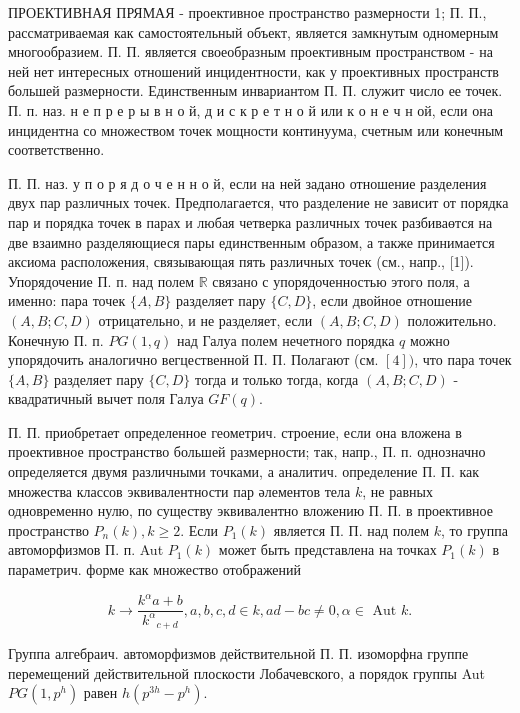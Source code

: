 \documentclass[10pt]{article}
\begin{document}
ПРОЕКТИВНАЯ ПРЯМАЯ - проективное пространство размерности 1; П. П., рассматриваемая как самостоятельный объект, является замкнутым одномерным многообразием. П. П. является своеобразным проективным пространством - на ней нет интересных отношений инцидентности, как у проективных пространств большей размерности. Единственным инвариантом П. П. служит число ее точек. П. п. наз. н е п р е р ы в н о й, д и с к р е т н о й или к о н е ч н ой, если она инцидентна со множеством точек мощности континуума, счетным или конечным соответственно.



П. П. наз. у п о р я д о ч е н н о й, если на ней задано отношение разделения двух пар различных точек. Предполагается, что разделение не зависит от порядка пар и порядка точек в парах и любая четверка различных точек разбиваөтся на две взаимно разделяющиеся пары единственным образом, а также принимается аксиома расположения, связывающая пять различных точек (см., напр., [1]). Упорядочение П. п. над полем $\mathbb{R}$ связано с упорядоченностью этого поля, а именно: пара точек $\{A, B\}$ разделяет пару $\{C, D\}$, если двойное отношение $(A, B ; C, D)$ отрицательно, и не разделяет, если $(A, B ; C, D)$ положительно. Конечную П. п. $P G(1, q)$ над Галуа полем нечетного порядка $q$ можно упорядочить аналогично вегцественной П. П. Полагают (см. $[4])$, что пара точек $\{A, B\}$ разделяет пару $\{C, D\}$ тогда и только тогда, когда $(A, B ; C, D)$ - квадратичный вычет поля Галуа $G F(q)$.



П. П. приобретает определенное геометрич. строение, если она вложена в проективное пространство большей размерности; так, напр., П. п. однозначно определяется двумя различными точками, а аналитич. определение П. П. как множества классов эквивалентности пар әлементов тела $k$, не равных одновременно нулю, по существу эквивалентно вложению П. П. в проективное пространство $P_{n}(k), k \geqslant 2$. Если $P_{1}(k)$ является П. П. над полем $k$, то группа автоморфизмов П. п. Aut $P_{1}(k)$ может быть представлена на точках $P_{1}(k)$ в параметрич. форме как множество отображений



\[

k \longrightarrow \frac{k^{\alpha} a+b}{k^{\alpha}{ }_{c+d}}, a, b, c, d \in k, a d-b c \neq 0, \alpha \in \text { Aut } k .

\]



Группа алгебраич. автоморфизмов действительной П. П. изоморфна группе перемещений действительной плоскости Лобачевского, а порядок группы Aut $P G\left(1, p^{h}\right)$ равен $h\left(p^{3 h}-p^{h}\right)$.
\end{document}
